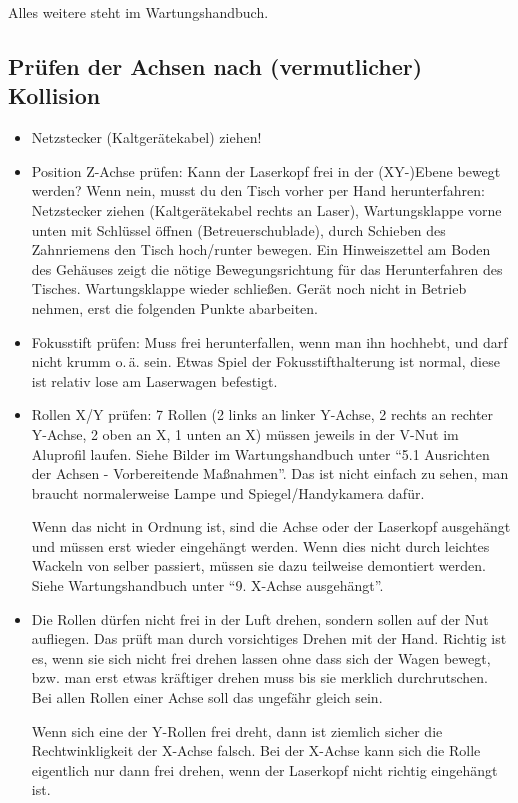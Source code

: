 \documentclass{\basedir/fablab-document}
\begin{document}
Alles weitere steht im Wartungshandbuch.

\subsection{Prüfen der Achsen nach (vermutlicher) Kollision} \label{sec:wartung-ltt:kollision}
	\begin{itemize}
		\item Netzstecker (Kaltgerätekabel) ziehen!
		\item Position Z-Achse prüfen: Kann der Laserkopf frei in der (XY-)Ebene bewegt werden? Wenn nein, musst du den Tisch vorher per Hand herunterfahren: Netzstecker ziehen (Kaltgerätekabel rechts an Laser), Wartungsklappe vorne unten mit Schlüssel öffnen (Betreuerschublade), durch Schieben des Zahnriemens den Tisch hoch/runter bewegen. Ein Hinweiszettel am Boden des Gehäuses zeigt die nötige Bewegungsrichtung für das Herunterfahren des Tisches. Wartungsklappe wieder schließen. Gerät noch nicht in Betrieb nehmen, erst die folgenden Punkte abarbeiten.
		\item Fokusstift prüfen: Muss frei herunterfallen, wenn man ihn hochhebt, und darf nicht krumm o.\,ä. sein. Etwas Spiel der Fokusstifthalterung ist normal, diese ist relativ lose am Laserwagen befestigt.
		\item Rollen X/Y prüfen: 7 Rollen (2 links an linker Y-Achse, 2 rechts an rechter Y-Achse, 2 oben an X, 1 unten an X) müssen jeweils in der V-Nut im Aluprofil laufen. Siehe Bilder im Wartungshandbuch unter \enquote{5.1 Ausrichten der Achsen - Vorbereitende Maßnahmen}. Das ist nicht einfach zu sehen, man braucht normalerweise Lampe und Spiegel/Handykamera dafür.

		Wenn das nicht in Ordnung ist, sind die Achse oder der Laserkopf ausgehängt und müssen erst wieder eingehängt werden. Wenn dies nicht durch leichtes Wackeln von selber passiert, müssen sie dazu teilweise demontiert werden. Siehe Wartungshandbuch unter \enquote{9. X-Achse ausgehängt}.
		\item Die Rollen dürfen nicht frei in der Luft drehen, sondern sollen auf der Nut aufliegen. Das prüft man durch vorsichtiges Drehen mit der Hand. Richtig ist es, wenn sie sich nicht frei drehen lassen ohne dass sich der Wagen bewegt, bzw. man erst etwas kräftiger drehen muss bis sie merklich durchrutschen. 	Bei allen Rollen einer Achse soll das ungefähr gleich sein.

		Wenn sich eine der Y-Rollen frei dreht, dann ist ziemlich sicher die Rechtwinkligkeit der X-Achse falsch. Bei der X-Achse kann sich die Rolle eigentlich nur dann frei drehen, wenn der Laserkopf nicht richtig eingehängt ist.



\end{itemize}
\end{document}
